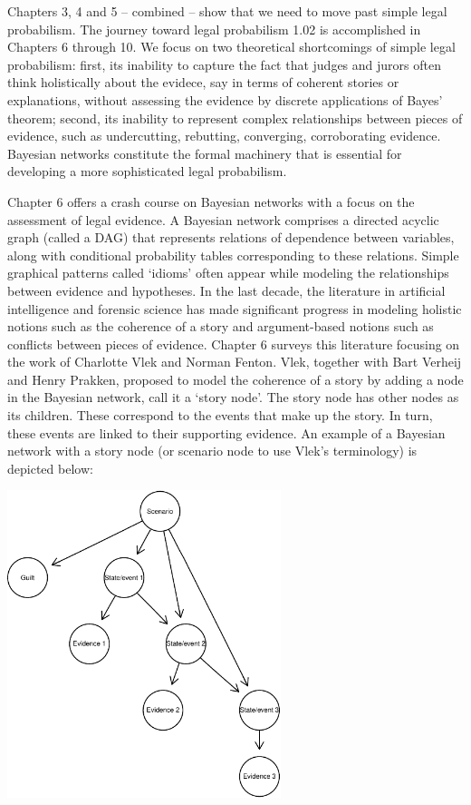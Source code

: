 \documentclass[10pt,dvipsnames,enabledeprecatedfontcommands]{scrartcl}
\begin{document}
Chapters 3, 4 and 5 -- combined -- show that we need to move past simple
legal probabilism. The journey toward legal probabilism 1.02 is
accomplished in Chapters 6 through 10. We focus on two theoretical
shortcomings of simple legal probabilism: first, its inability to
capture the fact that judges and jurors often think holistically about
the evidece, say in terms of coherent stories or explanations, without
assessing the evidence by discrete applications of Bayes' theorem;
second, its inability to represent complex relationships between pieces
of evidence, such as undercutting, rebutting, converging, corroborating
evidence. Bayesian networks constitute the formal machinery that is
essential for developing a more sophisticated legal probabilism.

Chapter 6 offers a crash course on Bayesian networks with a focus on the
assessment of legal evidence. A Bayesian network comprises a directed
acyclic graph (called a DAG) that represents relations of dependence
between variables, along with conditional probability tables
corresponding to these relations. Simple graphical patterns called
`idioms' often appear while modeling the relationships between evidence
and hypotheses. In the last decade, the literature in artificial
intelligence and forensic science has made significant progress in
modeling holistic notions such as the coherence of a story and
argument-based notions such as conflicts between pieces of evidence.
Chapter 6 surveys this literature focusing on the work of Charlotte Vlek
and Norman Fenton. Vlek, together with Bart Verheij and Henry Prakken,
proposed to model the coherence of a story by adding a node in the
Bayesian network, call it a `story node'. The story node has other nodes
as its children. These correspond to the events that make up the story.
In turn, these events are linked to their supporting evidence. An
example of a Bayesian network with a story node (or scenario node to use
Vlek's terminology) is depicted below:

\begin{center}
\includegraphics[width=8cm]{vlek-scenario-node.pdf}
 \end{center}
\end{document}
